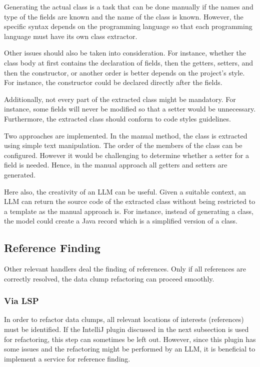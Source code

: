 Generating the actual class is a task that can be done manually if the names and type of the fields are known and the name of the class is known. However, the specific syntax depends on the programming language so that each programming language must have its own class extractor.

Other issues should also be taken into consideration. For instance, whether the class body at first contains the declaration of fields, then the getters, setters, and then the constructor, or another order is better depends on the project's style. For instance, the constructor could be declared directly after the fields.

Additionally, not every part of the extracted class might be mandatory. For instance, some fields will never be modified so that a setter would be unnecessary. Furthermore, the extracted class should conform to code styles guidelines. 

Two approaches are implemented. In the manual method, the class is extracted using simple text manipulation. The order of the members of the class can be configured.  However it would be challenging to determine whether a setter for a field is needed. Hence, in the manual approach all getters and setters are generated.

Here also, the creativity of an \ac{LLM} can be useful. Given a suitable context, an \ac{LLM} can return the source code of the extracted class without being restricted to a template as the manual approach is. For instance, instead of generating a class, the model could create a Java record which is a simplified version of a class. 

\subsection{Reference Finding}

Other relevant handlers deal the finding of references. Only if all references are correctly resolved, the data clump refactoring can proceed smoothly. 

\subsubsection{Via \ac{LSP}}
In order to refactor data clumps, all relevant locations of interests (references) must be identified. If the IntelliJ plugin discussed in the next subsection is used for refactoring, this step can sometimes be left out. However, since this plugin has some issues and the refactoring might be performed by an \ac{LLM}, it is beneficial to implement a service for reference finding. 

